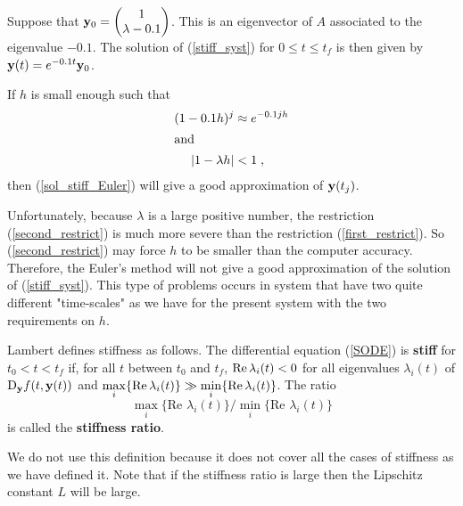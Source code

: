 \begin{egg}
Suppose that
$\mathbf{y}_0 = \begin{pmatrix}
1 \\ \lambda-0.1
\end{pmatrix}$.  This is an eigenvector of $A$ associated to the
eigenvalue $-0.1$.   The solution of (\ref{stiff_syst}) for
$0\leq t \leq t_f$ is then given by $\mathbf{y}(t) = e^{-0.1 t} \mathbf{y}_0$.

If $h$ is small enough such that
\begin{align}
(1-0.1h)^j &\approx e^{-0.1 jh} \label{first_restrict}\\
\intertext{and}
| 1 - \lambda h | &< 1  \; , \label{second_restrict}
\end{align}
then (\ref{sol_stiff_Euler}) will give a good approximation of
$\mathbf{y}(t_j)$.

Unfortunately, because $\lambda$ is a large positive number, the
restriction (\ref{second_restrict}) is much more severe than the
restriction (\ref{first_restrict}).  So (\ref{second_restrict}) may force
$h$ to be smaller than the computer accuracy.  Therefore, the Euler's method
will not give a good approximation of the solution of
(\ref{stiff_syst}).  This type of problems occurs in system that have
two quite different "time-scales" as we have for the present system with
the two requirements on $h$.
\end{egg}

\begin{rmk}
Lambert \cite{La} defines stiffness as follows.
The differential equation (\ref{SODE}) is
{\bfseries stiff}
for $t_0 < t < t_f$ if, for all $t$ between $t_0$ and $t_f$,
$\operatorname{Re} \lambda_i(t) < 0$ for all eigenvalues $\lambda_i(t)$
of $\displaystyle \mathrm{D}_{\mathbf{y}} f(t,\mathbf{y}(t))$ and
$\displaystyle \max_i \{ \operatorname{Re} \lambda_i(t) \} \gg
\min_i \{ \operatorname{Re} \lambda_i(t) \}$.  The ratio
\[
\max_i \{ \text{Re }\lambda_i(t) \}/\min_i \{\text{Re }\lambda_i(t)\}
\]
is called the {\bfseries stiffness ratio}.

We do not use this definition because it does not cover all the cases
of stiffness as we have defined it.  Note that if the stiffness ratio is
large then the Lipschitz constant $L$ will be large.
\end{rmk}

